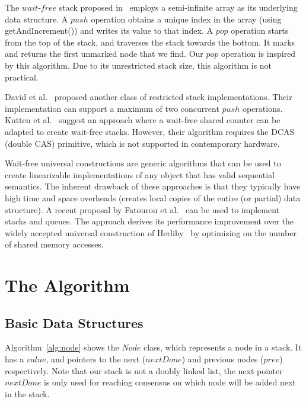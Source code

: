 \documentclass{llncs}
\begin{document}
The $wait$-$free$ stack proposed in~\cite{arrayBased} employs a semi-infinite
array as its underlying data structure. A $push$ operation obtains a unique index in the
array (using getAndIncrement()) and writes its value to that index. A $pop$
operation starts from the top of the stack, and traverses the stack towards the bottom.
It marks and returns the first unmarked node that we find. Our $pop$ operation
is inspired by this algorithm. Due to its unrestricted stack size, this algorithm
is not practical.

David et al.~\cite{restrictedStack} proposed another class of
 restricted stack implementations.
Their implementation can support a maximum of two concurrent $push$ operations.
Kutten et al.~\cite{WaitFreeSharedCounter1,WaitFreeSharedCounter2} suggest an
approach where a wait-free shared counter can be adapted to
create wait-free stacks. However, their algorithm requires the DCAS (double
CAS) primitive, which is not supported in contemporary hardware. 

Wait-free universal constructions are generic algorithms that can be used to create linearizable implementations of any
object that has valid sequential semantics.  The inherent drawback of these approaches is that they typically have
high time and space overheads (creates local copies of the entire (or partial) data structure).
  A recent proposal by Fatourou et al.~\cite{newUniversal} can be used to implement stacks
and queues.  The approach derives its performance improvement over the widely accepted universal construction of
Herlihy~\cite{oldUniversal} by optimizing on the number of shared memory accesses. 
\section{The Algorithm}

\subsection{Basic Data Structures}
Algorithm~\ref{alg:node} shows the $Node$ class, which represents a node in a stack. 
It has a $value$, and pointers to the next ($nextDone$) and previous nodes ($prev$) respectively.
Note that our stack is not a doubly linked list, the next pointer $nextDone$ is only used for reaching consensus on which node will be added next in the stack. 
\end{document}
